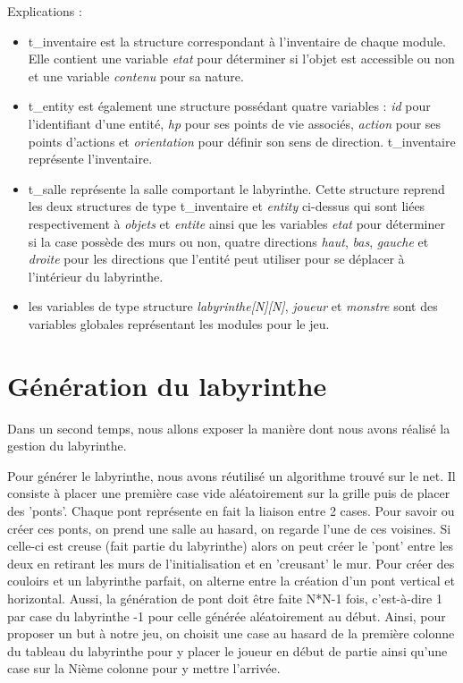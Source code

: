 \documentclass[a4paper,11pt]{report}
\begin{document}
    Explications :

      \begin{itemize}
        \item t\_inventaire est la structure correspondant à l'inventaire de chaque module. Elle contient une variable \textit{etat} pour déterminer si l'objet est accessible ou non et une variable \textit{contenu} pour sa nature.
    
        \item t\_entity est également une structure possédant quatre variables : \textit{id} pour l'identifiant d'une entité, \textit{hp} pour ses points de vie associés, \textit{action} pour ses points d'actions et \textit{orientation} pour définir son sens de direction. t\_inventaire représente l'inventaire.
    
        \item t\_salle représente la salle comportant le labyrinthe. Cette structure reprend les deux structures de type t\_inventaire et \textit{entity} ci-dessus qui sont liées respectivement à \textit{objets} et \textit{entite} ainsi que les variables \textit{etat} pour déterminer si la case possède des murs ou non, quatre directions \textit{haut}, \textit{bas}, \textit{gauche} et \textit{droite} pour les directions que l'entité peut utiliser pour se déplacer à l'intérieur du labyrinthe.
      
        \item les variables de type structure \textit{labyrinthe[N][N]}, \textit{joueur} et \textit{monstre} sont des variables globales représentant les modules pour le jeu.
      \end{itemize}

    \section{Génération du labyrinthe}
Dans un second temps, nous allons exposer la manière dont nous avons réalisé la gestion du labyrinthe.

Pour générer le labyrinthe, nous avons réutilisé un algorithme trouvé sur le net. Il consiste à placer une première case vide aléatoirement sur la grille puis de placer des 'ponts'. Chaque pont représente en fait la liaison entre 2 cases. Pour savoir ou créer ces ponts, on prend une salle au hasard, on regarde l'une de ces voisines. Si celle-ci est creuse (fait partie du labyrinthe) alors on peut créer le 'pont' entre les deux en retirant les murs de l'initialisation et en 'creusant' le mur. Pour créer des couloirs et un labyrinthe parfait, on alterne entre la création d'un pont vertical et horizontal. Aussi, la génération de pont doit être faite N*N-1 fois, c'est-à-dire 1 par case du labyrinthe -1 pour celle générée aléatoirement au début. Ainsi, pour proposer un but à notre jeu, on choisit une case au hasard de la première colonne du tableau du labyrinthe pour y placer le joueur en début de partie ainsi qu'une case sur la Nième colonne pour y mettre l'arrivée.
\end{document}
